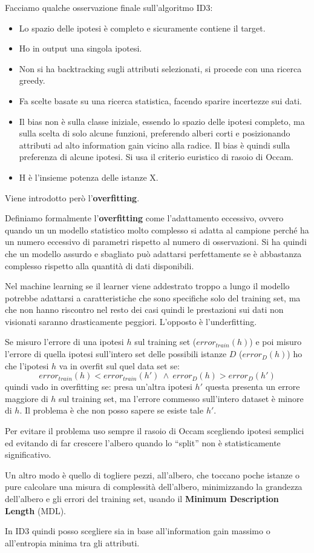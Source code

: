 Facciamo qualche osservazione finale sull'algoritmo ID3:
\begin{itemize}
    \item Lo spazio delle ipotesi è completo e sicuramente contiene il target.
    \item Ho in output una singola ipotesi.
    \item Non si ha backtracking sugli attributi selezionati, si procede con una ricerca greedy.
    \item Fa scelte basate su una ricerca statistica, facendo sparire incertezze sui dati.
    \item Il bias non è sulla classe iniziale, essendo lo spazio delle ipotesi completo, ma sulla scelta di solo alcune funzioni, preferendo alberi corti e posizionando attributi ad alto information gain vicino alla radice. Il bias è quindi sulla preferenza di alcune ipotesi. Si usa il criterio euristico di rasoio di Occam.
    \item H è l'insieme potenza delle istanze X.
\end{itemize}

Viene introdotto però l'\textbf{overfitting}.
\begin{definizione}
    Definiamo formalmente l'\textbf{overfitting} come l'adattamento eccessivo, ovvero quando un un modello statistico molto complesso si adatta al campione perché ha un numero eccessivo di parametri rispetto al numero di osservazioni. Si ha quindi che un modello assurdo e sbagliato può adattarsi perfettamente se è abbastanza complesso rispetto alla quantità di dati disponibili.
    
    Nel machine learning se il learner viene addestrato troppo a lungo il modello potrebbe adattarsi a caratteristiche che sono specifiche solo del training set, ma che non hanno riscontro nel resto dei casi quindi le prestazioni sui dati non visionati saranno drasticamente peggiori. L'opposto è l'underfitting.
\end{definizione}

Se misuro l'errore di una ipotesi $h$ sul training set ($error_{train}(h)$) e poi misuro l'errore di quella ipotesi sull'intero set delle possibili istanze $D$ ($error_D(h)$) ho che l'ipotesi $h$ va in overfit sul quel data set se:
\begin{equation}
    error_{train}(h) < error_{train}(h') \ \land \ error_D(h) > error_D(h')
\end{equation}
quindi vado in overfitting se: presa un'altra ipotesi $h'$ questa presenta un errore maggiore di $h$ sul training set, ma l'errore commesso sull'intero dataset è minore di $h$. Il problema è che non posso sapere se esiste tale $h'$. 

Per evitare il problema uso sempre il rasoio di Occam scegliendo ipotesi semplici ed evitando di far crescere l'albero quando lo “split” non è statisticamente significativo.

Un altro modo è quello di togliere pezzi, all'albero, che toccano poche istanze o pure calcolare una misura di complessità dell'albero, minimizzando la grandezza dell'albero e gli errori del training set, usando il \textbf{Minimum Description Length} (MDL).

In ID3 quindi posso scegliere sia in base all'information gain massimo o all'entropia minima tra gli attributi.